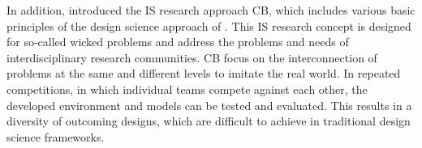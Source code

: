 In addition,  introduced the IS research approach CB,
which includes various basic principles of the design science approach of .
This IS research concept is designed for so-called wicked problems and address the problems and needs of interdisciplinary
research communities. CB focus on the interconnection of problems at the same and different levels to imitate the real world.
In repeated competitions, in which individual teams compete against each other, the developed environment and models
can be tested and evaluated. This results in a diversity of outcoming designs, which are difficult to achieve in
traditional design science frameworks.

\clearpage